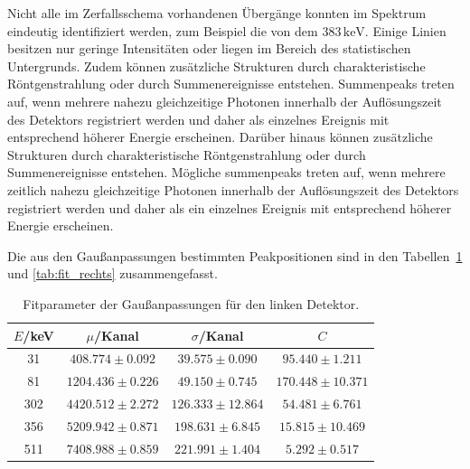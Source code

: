 Nicht alle im Zerfallsschema vorhandenen Übergänge konnten im Spektrum eindeutig identifiziert werden, zum Beispiel die von dem $383\,\mathrm{keV}$. 
Einige Linien besitzen nur geringe Intensitäten oder liegen im Bereich des statistischen Untergrunds. 
Zudem können zusätzliche Strukturen durch charakteristische Röntgenstrahlung oder durch Summenereignisse entstehen. 
Summenpeaks treten auf, wenn mehrere nahezu gleichzeitige Photonen innerhalb der Auflösungszeit des Detektors registriert werden und daher als einzelnes Ereignis mit entsprechend höherer Energie erscheinen. 
Darüber hinaus können zusätzliche Strukturen durch charakteristische Röntgenstrahlung oder durch Summenereignisse entstehen. 
Mögliche summenpeaks treten auf, wenn mehrere zeitlich nahezu gleichzeitige Photonen innerhalb der Auflösungszeit des Detektors registriert werden und daher als ein einzelnes Ereignis mit entsprechend höherer Energie erscheinen.

Die aus den Gaußanpassungen bestimmten Peakpositionen sind in den Tabellen~\ref{tab:fit_links} und \ref{tab:fit_rechts} zusammengefasst. 

\begin{table}[htbp] 
    \centering 
    \caption{Fitparameter der Gaußanpassungen für den linken Detektor.} 
    \label{tab:fit_links} 
    \begin{tabular}{c c c c} 
        \hline 
        $E$/keV & $\mu$/Kanal & $\sigma$/Kanal & $C$ \\ 
        \hline 
        31 & $408.774 \pm 0.092$ & $39.575 \pm 0.090$ & $95.440 \pm 1.211$ \\ 
        81 & $1204.436 \pm 0.226$ & $49.150 \pm 0.745$ & $170.448 \pm 10.371$ \\ 
        302 & $4420.512 \pm 2.272$ & $126.333 \pm 12.864$ & $54.481 \pm 6.761$ \\ 
        356 & $5209.942 \pm 0.871$ & $198.631 \pm 6.845$ & $15.815 \pm 10.469$ \\ 
        511 & $7408.988 \pm 0.859$ & $221.991 \pm 1.404$ & $5.292 \pm 0.517$ \\ 
        \hline 
    \end{tabular} 
\end{table} 

